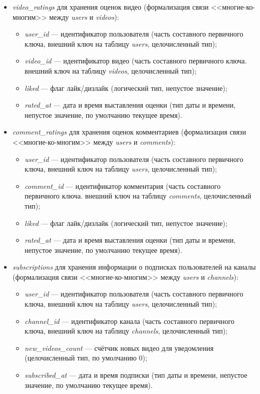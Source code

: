 \begin{itemize}
    \item \textit{video\_ratings} для хранения оценок видео (формализация связи <<многие-ко-многим>> между \textit{users} и \textit{videos}):
    \begin{itemize}
        \item \textit{user\_id} --- идентификатор пользователя (часть составного первичного ключа, внешний ключ на таблицу \textit{users}, целочисленный тип);
        \item \textit{video\_id} --- идентификатор видео (часть составного первичного ключа.
        внешний ключ на таблицу \textit{videos}, целочисленный тип);
        \item \textit{liked} --- флаг лайк/дизлайк (логический тип, непустое значение);
        \item \textit{rated\_at} --- дата и время выставления оценки (тип даты и времени, непустое значение, по умолчанию текущее время).
    \end{itemize}

    \item \textit{comment\_ratings} для хранения оценок комментариев (формализация связи <<многие-ко-многим>> между \textit{users} и \textit{comments}):
    \begin{itemize}
        \item \textit{user\_id} --- идентификатор пользователя (часть составного первичного ключа, внешний ключ на таблицу \textit{users}, целочисленный тип);
        \item \textit{comment\_id} --- идентификатор комментария (часть составного первичного ключа.
        внешний ключ на таблицу \textit{comments}, целочисленный тип);
        \item \textit{liked} --- флаг лайк/дизлайк (логический тип, непустое значение);
        \item \textit{rated\_at} --- дата и время выставления оценки (тип даты и времени, непустое значение, по умолчанию текущее время).
    \end{itemize}

    \item \textit{subscriptions} для хранения информации о подписках пользователей на каналы (формализация связи <<многие-ко-многим>> между \textit{users} и \textit{channels}):
    \begin{itemize}
        \item \textit{user\_id} --- идентификатор пользователя (часть составного первичного ключа, внешний ключ на таблицу \textit{users}, целочисленный тип);
        \item \textit{channel\_id} --- идентификатор канала (часть составного первичного ключа, внешний ключ на таблицу \textit{channels}, целочисленный тип);
        \item \textit{new\_videos\_count} --- счётчик новых видео для уведомления (целочисленный тип, по умолчанию 0);
        \item \textit{subscribed\_at} --- дата и время подписки (тип даты и времени, непустое значение, по умолчанию текущее время).
    \end{itemize}
\end{itemize}

